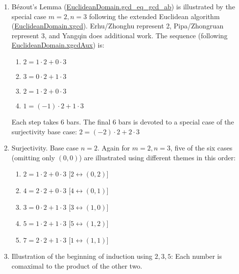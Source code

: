 \documentclass[12pt]{article}
\begin{document}
\begin{enumerate}

\item Bézout’s Lemma
  (\href{https://leanprover-community.github.io/mathlib4_docs/Mathlib/Algebra/EuclideanDomain/Basic.html#EuclideanDomain.gcd_eq_gcd_ab}{EuclideanDomain.gcd\_eq\_gcd\_ab})
  is illustrated by the special case $m = 2, n = 3$ following
  the extended Euclidean algorithm
  (\href{https://leanprover-community.github.io/mathlib4_docs/Mathlib/Algebra/EuclideanDomain/Defs.html#EuclideanDomain.xgcd}{EuclideanDomain.xgcd}).
Erhu/Zhonghu represent
2, Pipa/Zhongruan represent 3, and Yangqin does additional work. The
sequence (following
\href{https://leanprover-community.github.io/mathlib4_docs/Mathlib/Algebra/EuclideanDomain/Defs.html#EuclideanDomain.xgcdAux}{EuclideanDomain.xgcdAux}) is:

\begin{enumerate}
\item $2 = 1\cdot 2 + 0\cdot 3$
\item $3 = 0\cdot 2 + 1\cdot 3$
\item $2 = 1\cdot 2 + 0\cdot 3$
\item $1 = (-1)\cdot 2 + 1\cdot 3$
\end{enumerate}

Each step takes 6 bars. The final 6 bars is devoted to a special case
of the surjectivity base case: $2 = (-2)\cdot 2 + 2\cdot 3$

\item Surjectivity. Base case $n=2$.
Again for $m = 2, n = 3$, five of the six cases (omitting only
  $(0,0)$) are illustrated using different themes in this order:

\begin{enumerate}
\item $2 = 1\cdot 2 + 0\cdot 3$ [$2 \leftrightarrow (0,2)]$
\item $4 = 2\cdot 2 + 0\cdot 3$ [$4 \leftrightarrow (0,1)]$
\item $3 = 0\cdot 2 + 1\cdot 3$ [$3 \leftrightarrow (1,0)]$
\item $5 = 1\cdot 2 + 1\cdot 3$ [$5 \leftrightarrow (1,2)]$
\item $7 = 2\cdot 2 + 1\cdot 3$ [$1 \leftrightarrow (1,1)]$
\end{enumerate}

\item Illustration of the beginning of induction using $2,3,5$: Each
  number is comaximal to the product of the other two.


\end{enumerate}
\end{document}
